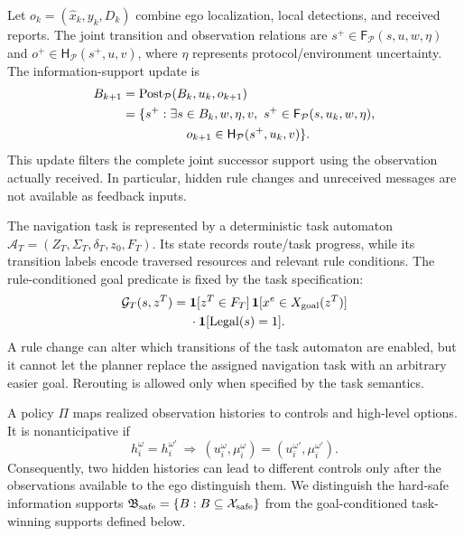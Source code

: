 \documentclass[letterpaper]{article} %
\begin{document}
Let $o_k=(\hat x_k,y_k,D_k)$ combine ego localization, local detections, and received reports. The joint transition and observation relations are $s^+\in\mathsf F_{\mathcal P}(s,u,w,\eta)$ and $o^+\in\mathsf H_{\mathcal P}(s^+,u,v)$, where $\eta$ represents protocol/environment uncertainty. The information-support update is
\begin{equation}
\begin{aligned}
B_{k+1}&=\operatorname{Post}_{\mathcal P}(B_k,u_k,o_{k+1})\\
&=\{s^+:\exists s\in B_k,w,\eta,v,\ s^+\in\mathsf F_{\mathcal P}(s,u_k,w,\eta),\\
&\hspace{5.1em}o_{k+1}\in\mathsf H_{\mathcal P}(s^+,u_k,v)\}.
\end{aligned}
\label{eq:belief-update}
\end{equation}
This update filters the complete joint successor support using the observation actually received. In particular, hidden rule changes and unreceived messages are not available as feedback inputs.

The navigation task is represented by a deterministic task automaton $\mathcal A_T=(Z_T,\Sigma_T,\delta_T,z_0,F_T)$. Its state records route/task progress, while its transition labels encode traversed resources and relevant rule conditions. The rule-conditioned goal predicate is fixed by the task specification:
\begin{equation}
\begin{aligned}
\mathcal G_T(s,z^T)={}&\mathbf 1[z^T\in F_T]\,\mathbf 1[x^e\in X_{\rm goal}(z^T)]\\
&\cdot\mathbf 1[\operatorname{Legal}(s)=1].
\end{aligned}
\label{eq:goal-predicate}
\end{equation}
A rule change can alter which transitions of the task automaton are enabled, but it cannot let the planner replace the assigned navigation task with an arbitrary easier goal. Rerouting is allowed only when specified by the task semantics.

A policy $\Pi$ maps realized observation histories to controls and high-level options. It is nonanticipative if
\begin{equation}
h_i^\omega=h_i^{\omega'}\ \Longrightarrow\ (u_i^\omega,\mu_i^\omega)=(u_i^{\omega'},\mu_i^{\omega'}).
\label{eq:nonanticipativity}
\end{equation}
Consequently, two hidden histories can lead to different controls only after the observations available to the ego distinguish them. We distinguish the hard-safe information supports $\mathfrak B_{\rm safe}=\{B:B\subseteq\mathcal X_{\rm safe}\}$ from the goal-conditioned task-winning supports defined below.
\end{document}
